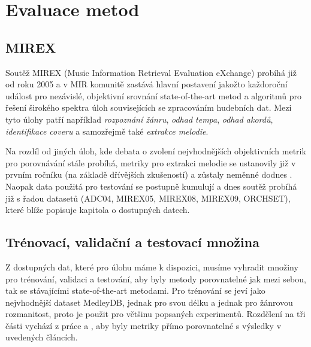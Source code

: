 \chapter{Evaluace metod}

\section{MIREX}

Soutěž MIREX (Music Information Retrieval Evaluation eXchange) probíhá již od roku 2005 a v MIR komunitě zastává hlavní postavení jakožto každoroční událost pro nezávislé, objektivní srovnání state-of-the-art metod a algoritmů pro řešení širokého spektra úloh souvisejících se zpracováním hudebních dat. Mezi tyto úlohy patří například \textit{rozpoznání žánru}, \textit{odhad tempa}, \textit{odhad akordů}, \textit{identifikace coveru} a samozřejmě také \textit{extrakce melodie}.

Na rozdíl od jiných úloh, kde debata o zvolení nejvhodnějších objektivních metrik pro porovnávání stále probíhá, metriky pro extrakci melodie se ustanovily již v prvním ročníku (na základě dřívějších zkušeností) a zůstaly neměnné dodnes \cite{Raffel2014}. Naopak data použitá pro testování se postupně kumulují a dnes soutěž probíhá již s řadou datasetů (ADC04, MIREX05, MIREX08, MIREX09, ORCHSET), které blíže popisuje kapitola o dostupných datech.


\section{Trénovací, validační a testovací množina}

Z dostupných dat, které pro úlohu máme k dispozici, musíme vyhradit množiny pro trénování, validaci a testování, aby byly metody porovnatelné jak mezi sebou, tak se stávajícími state-of-the-art metodami. Pro trénování se jeví jako nejvhodnější dataset MedleyDB, jednak pro svou délku a jednak pro žánrovou rozmanitost, proto je použit pro většinu popsaných experimentů. Rozdělení na tři části vychází z práce \cite{Bittner2017} a \cite{DBasaranSEssid2018}, aby byly metriky přímo porovnatelné s výsledky v uvedených článcích. 


